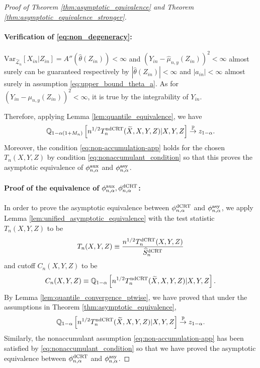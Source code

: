 \documentclass[12pt]{article}
\theoremstyle{definition}
\newcommand{\V}{\mathrm{Var}}							%
\newcommand{\Q}{\mathbb{Q}}								%
\newcommand{\convp}{\overset{\mathbb{P}}{\rightarrow}}             %
\newcommand{\srx}{X}									%
\newcommand{\srz}{Z}									%
\newcommand{\srxk}{\widetilde X}						%
\newcommand{\sry}{Y}									%
\newcommand{\lawhat}{\widehat{\mathcal L}}				%
\newcommand{\dCRT}{\textnormal{dCRT}} 					%
\newcommand{\ndCRThat}{\textnormal{ndCRT}}	%
\newcommand{\aux}{\textnormal{aux}}               %
\newcommand{\asy}{\textnormal{asy}}              %
\begin{document}
\begin{proof}[Proof of Theorem \ref{thm:asymptotic_equivalence} and Theorem \ref{thm:asymptotic_equivalence_stronger}]
  \paragraph{Verification of \eqref{eq:non_degeneracy}:}

  $\V_{\lawhat_n}[\srx_{in}|\srz_{in}]=A''(\widehat{\theta}(\srz_{in}))<\infty$ and $(\sry_{in}-\widehat{\mu}_{n,y}(\srz_{in}))^2<\infty$ almost surely can be guaranteed respectively by $|\widehat{\theta}(\srz_{in})|<\infty$ and $|a_{in}|<\infty$ almost surely in assumption \eqref{eq:upper_bound_theta_a}. As for $(\sry_{in}-\mu_{n,y}(\srz_{in}))^2<\infty$, it is true by the integrability of $\sry_{in}$.
  
  \noindent Therefore, applying Lemma \ref{lem:quantile_equivalence}, we have
	  \begin{align*}
		  \Q_{1-\alpha(1+M_n)}\left[n^{1/2}T_n^{\ndCRThat}(\srxk, \srx, \sry,\srz)|\srx,\sry,\srz\right]\convp z_{1-\alpha}.
	\end{align*}
	Moreover, the condition \eqref{eq:non-accumulation-app} holds for the chosen $T_n(\srx,\sry,\srz)$ by condition \eqref{eq:nonaccumulant_condition} so that this proves the asymptotic equivalence of $\phi_{n,\alpha}^{\aux}$ and $\phi_{n,\alpha}^{\asy}$. 
  
	\paragraph{Proof of the equivalence of $\phi_{n,\alpha}^{\aux},\phi_{n,\alpha}^{\dCRT}$:}
  
	In order to prove the asymptotic equivalence between $\phi_{n,\alpha}^{\dCRT}$ and $\phi_{n,\alpha}^{\asy}$, we apply Lemma \ref{lem:unified_asymptotic_equivalence} with the test statistic $T_n(\srx,\sry,\srz)$ to be
	\begin{align*}
	  T_n(\srx,\sry,\srz)\equiv\frac{n^{1/2}T_n^{\dCRT}(\srx,\sry,\srz)}{\widehat{S}_n^{\dCRT}}
	\end{align*}
	and cutoff $C_n(\srx,\sry,\srz)$ to be 
	\begin{align*}
		C_n(\srx,\sry,\srz)\equiv \Q_{1-\alpha}\left[n^{1/2}T_n^{\ndCRThat}(\srxk, \srx, \sry,\srz)|\srx,\sry,\srz\right].
	\end{align*}
	By Lemma \ref{lem:quantile_convergence_ptwise}, we have proved that under the assumptions in Theorem \ref{thm:asymptotic_equivalence}, 
	\begin{align*}
	  \Q_{1-\alpha}\left[n^{1/2}T_n^{\ndCRThat}(\srxk, \srx, \sry,\srz)|\srx,\sry,\srz\right]\convp z_{1-\alpha}.
	\end{align*}
	Similarly, the nonaccumulant assumption \eqref{eq:non-accumulation-app} has been satisfied by \eqref{eq:nonaccumulant_condition} so that we have proved the asymptotic equivalence between $\phi_{n,\alpha}^{\dCRT}$ and $\phi_{n,\alpha}^{\asy}$.
  \end{proof}
\end{document}
